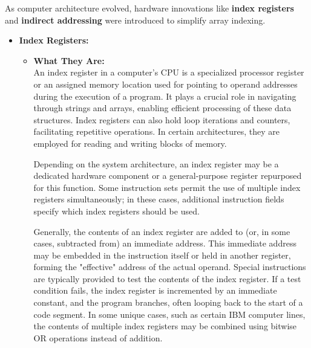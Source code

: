 \documentclass{book}
\begin{document}
		As computer architecture evolved, hardware innovations like \textbf{index registers} and  \textbf{indirect addressing} were introduced to simplify array indexing.
		\begin{itemize}
			\item \textbf{Index Registers:}
				\begin{itemize}
				 	\item \textbf{What They Are:} \\
				 			 An index register in a computer's CPU is a specialized processor register or an assigned memory location used for pointing to operand addresses during the execution of a program. It plays a crucial role in navigating through strings and arrays, enabling efficient processing of these data structures. Index registers can also hold loop iterations and counters, facilitating repetitive operations. In certain architectures, they are employed for reading and writing blocks of memory.
				 			 
				 			 Depending on the system architecture, an index register may be a dedicated hardware component or a general-purpose register repurposed for this function. Some instruction sets permit the use of multiple index registers simultaneously; in these cases, additional instruction fields specify which index registers should be used.
				 			 
				 			 Generally, the contents of an index register are added to (or, in some cases, subtracted from) an immediate address. This immediate address may be embedded in the instruction itself or held in another register, forming the "effective" address of the actual operand. Special instructions are typically provided to test the contents of the index register. If a test condition fails, the index register is incremented by an immediate constant, and the program branches, often looping back to the start of a code segment. In some unique cases, such as certain IBM computer lines, the contents of multiple index registers may be combined using bitwise OR operations instead of addition.
				 			 

\end{itemize}
\end{itemize}
\end{document}
